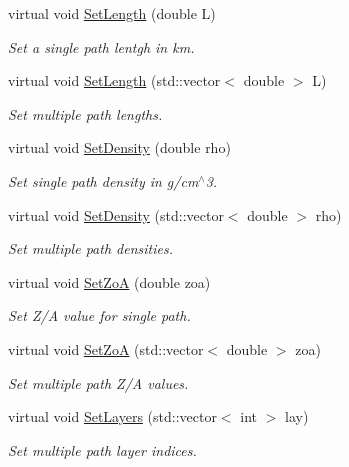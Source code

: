 \begin{DoxyCompactItemize}
virtual void \hyperlink{classOscProb_1_1PMNS__Base_a6241325b1bd28cafa556daaecbe4ed62}{Set\+Length} (double L)
\begin{DoxyCompactList}\small\item\em Set a single path lentgh in km. \end{DoxyCompactList}\item 
virtual void \hyperlink{classOscProb_1_1PMNS__Base_aa34a40a3b5abda0f252982d9ead3b520}{Set\+Length} (std\+::vector$<$ double $>$ L)
\begin{DoxyCompactList}\small\item\em Set multiple path lengths. \end{DoxyCompactList}\item 
virtual void \hyperlink{classOscProb_1_1PMNS__Base_ac74206f349687da141392c81e2ba6b0d}{Set\+Density} (double rho)
\begin{DoxyCompactList}\small\item\em Set single path density in g/cm$^\wedge$3. \end{DoxyCompactList}\item 
virtual void \hyperlink{classOscProb_1_1PMNS__Base_a858221d5510fe732dc6a101fd305cda0}{Set\+Density} (std\+::vector$<$ double $>$ rho)
\begin{DoxyCompactList}\small\item\em Set multiple path densities. \end{DoxyCompactList}\item 
virtual void \hyperlink{classOscProb_1_1PMNS__Base_a1bf3ea8fd2507fd2fd82d7410ff8f578}{Set\+ZoA} (double zoa)
\begin{DoxyCompactList}\small\item\em Set Z/A value for single path. \end{DoxyCompactList}\item 
virtual void \hyperlink{classOscProb_1_1PMNS__Base_a8495f8a320e1a21965e6a64aec92ad2a}{Set\+ZoA} (std\+::vector$<$ double $>$ zoa)
\begin{DoxyCompactList}\small\item\em Set multiple path Z/A values. \end{DoxyCompactList}\item 
virtual void \hyperlink{classOscProb_1_1PMNS__Base_a904e580edf89fb98bf9a6397739b4ebe}{Set\+Layers} (std\+::vector$<$ int $>$ lay)
\begin{DoxyCompactList}\small\item\em Set multiple path layer indices. \end{DoxyCompactList}\item 

\end{DoxyCompactItemize}
